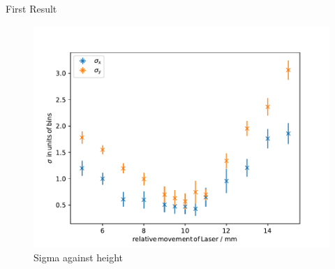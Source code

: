 \begin{frame}{ First Result }

     \begin{figure}
       \centering
       \includegraphics[width=1.05\textwidth]{./perfect_height.pdf}
       \caption{ Sigma against height }
       \label{ fig: iv_curve_theoretical}
     \end{figure}

\end{frame}



